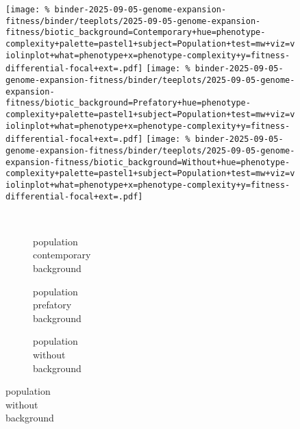 \begin{figure}
\begin{minipage}{\linewidth}
\texttt{[image: \%
binder-2025-09-05-genome-expansion-fitness/binder/teeplots/2025-09-05-genome-expansion-fitness/biotic\_background=Contemporary+hue=phenotype-complexity+palette=pastel1+subject=Population+test=mw+viz=violinplot+what=phenotype+x=phenotype-complexity+y=fitness-differential-focal+ext=.pdf]}
\texttt{[image: \%
binder-2025-09-05-genome-expansion-fitness/binder/teeplots/2025-09-05-genome-expansion-fitness/biotic\_background=Prefatory+hue=phenotype-complexity+palette=pastel1+subject=Population+test=mw+viz=violinplot+what=phenotype+x=phenotype-complexity+y=fitness-differential-focal+ext=.pdf]}%
\texttt{[image: \%
binder-2025-09-05-genome-expansion-fitness/binder/teeplots/2025-09-05-genome-expansion-fitness/biotic\_background=Without+hue=phenotype-complexity+palette=pastel1+subject=Population+test=mw+viz=violinplot+what=phenotype+x=phenotype-complexity+y=fitness-differential-focal+ext=.pdf]}

\vspace{-1ex}

\begin{subfigure}{0.135\linewidth}
~
\end{subfigure}%
\begin{subfigure}{0.305\linewidth}
    \centering
    \caption{\footnotesize population\\contemporary\\background}
    \label{fig:fitness-pcomplexity:population-contemporary}
\end{subfigure}%
\begin{subfigure}{0.305\linewidth}
    \centering
    \caption{\footnotesize population\\prefatory\\background}
    \label{fig:fitness-pcomplexity:population-prefatory}
\end{subfigure}%
\begin{subfigure}{0.255\linewidth}
    \centering
    \caption{\footnotesize population\\without\\background}
    \label{fig:fitness-pcomplexity:population-without}
\end{subfigure}
\end{minipage}



\end{figure}
